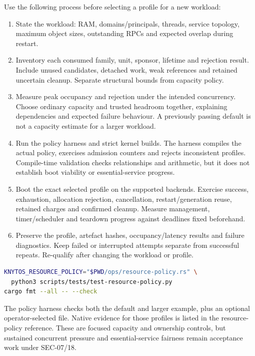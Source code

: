 Use the following process before selecting a profile for a new workload:
\begin{enumerate}
    \item State the workload: RAM, domains/principals, threads, service topology,
        maximum object sizes, outstanding RPCs and expected overlap during restart.
    \item Inventory each consumed family, unit, sponsor, lifetime and rejection
        result. Include unused candidates, detached work, weak references and
        retained uncertain cleanup. Separate structural bounds from capacity policy.
    \item Measure peak occupancy and rejection under the intended concurrency.
        Choose ordinary capacity and trusted headroom together, explaining
        dependencies and expected failure behaviour. A previously passing default
        is not a capacity estimate for a larger workload.
    \item Run the policy harness and strict kernel builds. The harness compiles
        the actual policy, exercises admission counters and rejects inconsistent
        profiles. Compile-time validation checks relationships and arithmetic, but
        it does not establish boot viability or essential-service progress.
    \item Boot the exact selected profile on the supported backends. Exercise
        success, exhaustion, allocation rejection, cancellation, restart/generation
        reuse, retained charges and confirmed cleanup. Measure management,
        timer/scheduler and teardown progress against deadlines fixed beforehand.
    \item Preserve the profile, artefact hashes, occupancy/latency results and
        failure diagnostics. Keep failed or interrupted attempts separate from
        successful repeats. Re-qualify after changing the workload or profile.
\end{enumerate}

\noindent\begin{minipage}{\linewidth}
\begin{lstlisting}[language=bash]
KNYTOS_RESOURCE_POLICY="$PWD/ops/resource-policy.rs" \
  python3 scripts/tests/test-resource-policy.py
cargo fmt --all -- --check
\end{lstlisting}
\end{minipage}

The policy harness checks both the default and larger example, plus an optional
operator-selected file. Native evidence for those profiles is listed in the resource-policy reference.
These are focused capacity and ownership controls, but sustained concurrent pressure and
essential-service fairness remain acceptance work under SEC-07/18.

